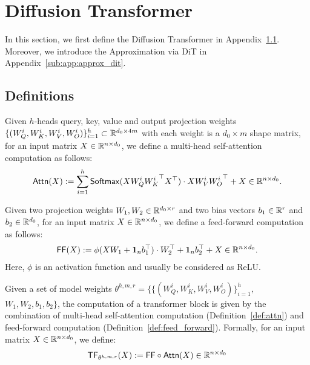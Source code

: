 \section{Diffusion Transformer} \label{sec:app:dit}

In this section, we first define the Diffusion Transformer in Appendix~\ref{sub:app:def}. Moreover, we introduce the Approximation via DiT in Appendix~\ref{sub:app:approx_dit}.

\subsection{Definitions} \label{sub:app:def}

\begin{definition}\label{def:attn}
    Given $h$-heads query, key, value and output projection weights $\{(W_Q^i, W_K^i, W_V^i, W_O^i)\}_{i=1}^h \subset \mathbb{R}^{d_0 \times 4m}$ with each weight is a $d_0 \times m$ shape matrix, for an input matrix $X \in \mathbb{R}^{n \times d_0}$, we define a multi-head self-attention computation as follows:
    \begin{align*}
        {\sf Attn}(X) := \sum_{i=1}^h {\sf Softmax}( X W_Q^i {W_K^i}^\top X^\top ) \cdot X W_V^i {W_O^i}^\top + X \in \mathbb{R}^{n \times d_0}.
    \end{align*}
\end{definition}

\begin{definition}\label{def:feed_forward}
    Given two projection weights $W_1, W_2 \in \mathbb{R}^{d_0 \times r}$ and two bias vectors $b_1 \in \mathbb{R}^r$ and $b_2 \in \mathbb{R}^{d_0}$, for an input matrix $X \in \mathbb{R}^{n \times d_0}$, we define a feed-forward computation as follows:
    \begin{align*}
        {\sf FF}(X) := \phi(X W_1 + {\bf 1}_n b_1^\top) \cdot W_2^\top + {\bf 1}_n b_2^\top + X \in \mathbb{R}^{n \times d_0}.
    \end{align*}
    Here, $\phi$ is an activation function and usually be considered as ReLU.
\end{definition}

\begin{definition}\label{def:transformer_tf}
    Given a set of model weights $\theta^{h, m, r} = \{ \{(W_Q^i, W_K^i, W_V^i, W_O^i)\}_{i=1}^h,$ $ W_1, W_2, b_1, b_2 \}$, the computation of a transformer block is given by the combination of multi-head self-attention computation (Definition~\ref{def:attn}) and feed-forward computation (Definition~\ref{def:feed_forward}). Formally, for an input matrix $X \in \mathbb{R}^{n \times d_0}$, we define:
    \begin{align*}
        {\sf TF}_{\theta^{h, m, r}}(X) := {\sf FF} \circ {\sf Attn}(X) \in \mathbb{R}^{n \times d_0}
    \end{align*}
\end{definition}

